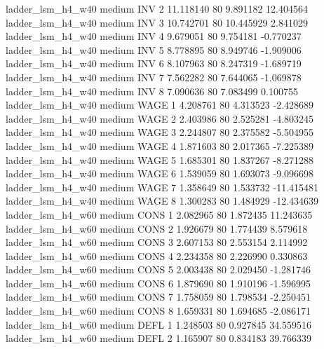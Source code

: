   ladder_lsm_h4_w40     medium      INV                 2 11.118140 80       9.891182          12.404564
  ladder_lsm_h4_w40     medium      INV                 3 10.742701 80      10.445929           2.841029
  ladder_lsm_h4_w40     medium      INV                 4  9.679051 80       9.754181          -0.770237
  ladder_lsm_h4_w40     medium      INV                 5  8.778895 80       8.949746          -1.909006
  ladder_lsm_h4_w40     medium      INV                 6  8.107963 80       8.247319          -1.689719
  ladder_lsm_h4_w40     medium      INV                 7  7.562282 80       7.644065          -1.069878
  ladder_lsm_h4_w40     medium      INV                 8  7.090636 80       7.083499           0.100755
  ladder_lsm_h4_w40     medium     WAGE                 1  4.208761 80       4.313523          -2.428689
  ladder_lsm_h4_w40     medium     WAGE                 2  2.403986 80       2.525281          -4.803245
  ladder_lsm_h4_w40     medium     WAGE                 3  2.244807 80       2.375582          -5.504955
  ladder_lsm_h4_w40     medium     WAGE                 4  1.871603 80       2.017365          -7.225389
  ladder_lsm_h4_w40     medium     WAGE                 5  1.685301 80       1.837267          -8.271288
  ladder_lsm_h4_w40     medium     WAGE                 6  1.539059 80       1.693073          -9.096698
  ladder_lsm_h4_w40     medium     WAGE                 7  1.358649 80       1.533732         -11.415481
  ladder_lsm_h4_w40     medium     WAGE                 8  1.300283 80       1.484929         -12.434639
  ladder_lsm_h4_w60     medium     CONS                 1  2.082965 80       1.872435          11.243635
  ladder_lsm_h4_w60     medium     CONS                 2  1.926679 80       1.774439           8.579618
  ladder_lsm_h4_w60     medium     CONS                 3  2.607153 80       2.553154           2.114992
  ladder_lsm_h4_w60     medium     CONS                 4  2.234358 80       2.226990           0.330863
  ladder_lsm_h4_w60     medium     CONS                 5  2.003438 80       2.029450          -1.281746
  ladder_lsm_h4_w60     medium     CONS                 6  1.879690 80       1.910196          -1.596995
  ladder_lsm_h4_w60     medium     CONS                 7  1.758059 80       1.798534          -2.250451
  ladder_lsm_h4_w60     medium     CONS                 8  1.659331 80       1.694685          -2.086171
  ladder_lsm_h4_w60     medium     DEFL                 1  1.248503 80       0.927845          34.559516
  ladder_lsm_h4_w60     medium     DEFL                 2  1.165907 80       0.834183          39.766339

